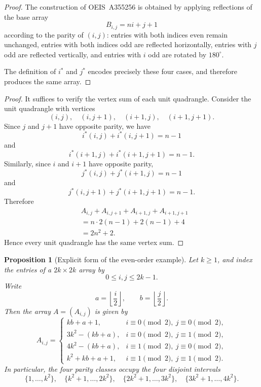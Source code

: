 \documentclass[11pt]{article}
\theoremstyle{plain}
\newtheorem{proposition}[theorem]{Proposition}
\theoremstyle{definition}
\begin{document}
\begin{proof}
The construction of OEIS~A355256 is obtained by applying reflections of the base array
\[
B_{i,j} = ni + j + 1
\]
according to the parity of $(i,j)$: entries with both indices even remain unchanged, entries with both indices odd are reflected horizontally, entries with $j$ odd are reflected vertically, and entries with $i$ odd are rotated by $180^\circ$.

The definition of $i^*$ and $j^*$ encodes precisely these four cases, and therefore produces the same array.
\end{proof}

\begin{proof}
It suffices to verify the vertex sum of each unit quadrangle.  Consider the
unit quadrangle with vertices
\[
(i,j),\quad (i,j+1),\quad (i+1,j),\quad (i+1,j+1).
\]
Since $j$ and $j+1$ have opposite parity, we have
\[
i^*(i,j)+i^*(i,j+1)=n-1
\]
and
\[
i^*(i+1,j)+i^*(i+1,j+1)=n-1.
\]
Similarly, since $i$ and $i+1$ have opposite parity,
\[
j^*(i,j)+j^*(i+1,j)=n-1
\]
and
\[
j^*(i,j+1)+j^*(i+1,j+1)=n-1.
\]
Therefore
\[
\begin{aligned}
&A_{i,j}+A_{i,j+1}+A_{i+1,j}+A_{i+1,j+1}\\
&=n\cdot 2(n-1)+2(n-1)+4\\
&=2n^2+2.
\end{aligned}
\]
Hence every unit quadrangle has the same vertex sum.
\end{proof}

\begin{proposition}[Explicit form of the even-order example]
Let $k\ge 1$, and index the entries of a $2k\times 2k$ array by
\[
0\le i,j\le 2k-1.
\]
Write
\[
a=\left\lfloor \frac{i}{2}\right\rfloor,\qquad
b=\left\lfloor \frac{j}{2}\right\rfloor .
\]
Then the array $A=(A_{i,j})$ is given by
\[
A_{i,j}=
\begin{cases}
kb+a+1, & i\equiv 0\pmod 2,\ j\equiv 0\pmod 2,\\[4pt]
3k^2-(kb+a), & i\equiv 0\pmod 2,\ j\equiv 1\pmod 2,\\[4pt]
4k^2-(kb+a), & i\equiv 1\pmod 2,\ j\equiv 0\pmod 2,\\[4pt]
k^2+kb+a+1, & i\equiv 1\pmod 2,\ j\equiv 1\pmod 2.
\end{cases}
\]
In particular, the four parity classes occupy the four disjoint intervals
\[
\{1,\dots,k^2\},\quad
\{k^2+1,\dots,2k^2\},\quad
\{2k^2+1,\dots,3k^2\},\quad
\{3k^2+1,\dots,4k^2\}.
\]
\end{proposition}
\end{document}
